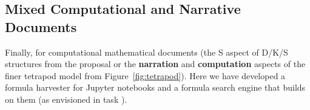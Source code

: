 \subsection{Mixed Computational and Narrative Documents}\label{subsec:software}
Finally, for computational mathematical documents (the S aspect of D/K/S structures from the \pn proposal or the \textbf{narration} and \textbf{computation} aspects of the finer tetrapod model from Figure~\ref{fig:tetrapod}). Here we have developed a formula harvester for Jupyter notebooks and a formula search engine that builds on them (as envisioned in task ).



